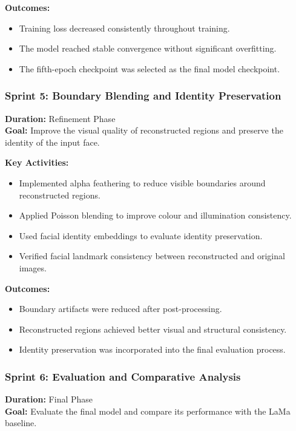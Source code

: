 \textbf{Outcomes:}
\begin{itemize}
    \item Training loss decreased consistently throughout training.
    \item The model reached stable convergence without significant overfitting.
    \item The fifth-epoch checkpoint was selected as the final model checkpoint.
\end{itemize}


\subsubsection{Sprint 5: Boundary Blending and Identity Preservation}
\textbf{Duration:} Refinement Phase\\
\textbf{Goal:} Improve the visual quality of reconstructed regions and preserve the identity of the input face.

\textbf{Key Activities:}
\begin{itemize}
    \item Implemented alpha feathering to reduce visible boundaries around reconstructed regions.
    \item Applied Poisson blending to improve colour and illumination consistency.
    \item Used facial identity embeddings to evaluate identity preservation.
    \item Verified facial landmark consistency between reconstructed and original images.
\end{itemize}

\textbf{Outcomes:}
\begin{itemize}
    \item Boundary artifacts were reduced after post-processing.
    \item Reconstructed regions achieved better visual and structural consistency.
    \item Identity preservation was incorporated into the final evaluation process.
\end{itemize}


\subsubsection{Sprint 6: Evaluation and Comparative Analysis}
\textbf{Duration:} Final Phase\\
\textbf{Goal:} Evaluate the final model and compare its performance with the LaMa baseline.

